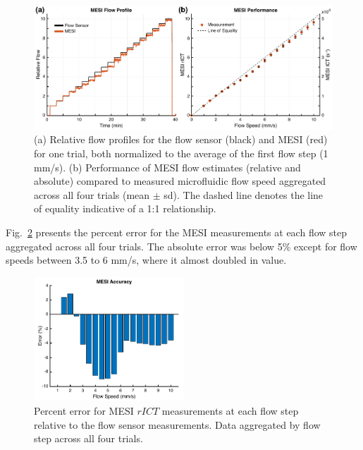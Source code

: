 \documentclass[12pt]{spieman}
\begin{document}
\begin{spacing}{2}
\begin{figure}
    \includegraphics[width=\textwidth]{Figure4.pdf}
    \caption {
        (a) Relative flow profiles for the flow sensor (black) and MESI (red) for one trial, both normalized to the average of the first flow step (1 mm/s). (b) Performance of MESI flow estimates (relative and absolute) compared to measured microfluidic flow speed aggregated across all four trials (mean $\pm$ sd). The dashed line denotes the line of equality indicative of a 1:1 relationship.
    }
    \label{fig:mesi_flow}
\end{figure}

Fig.~\ref{fig:mesi_error} presents the percent error for the MESI measurements at each flow step aggregated across all four trials. The absolute error was below 5\% except for flow speeds between 3.5 to 6 mm/s, where it almost doubled in value.

\begin{figure}
    \centering
    \includegraphics[width=0.5\textwidth]{Figure5.pdf}
    \caption {
        Percent error for MESI $rICT$ measurements at each flow step relative to the flow sensor measurements.  Data aggregated by flow step across all four trials.
    }
    \label{fig:mesi_error}
\end{figure}



\end{spacing}
\end{document}
